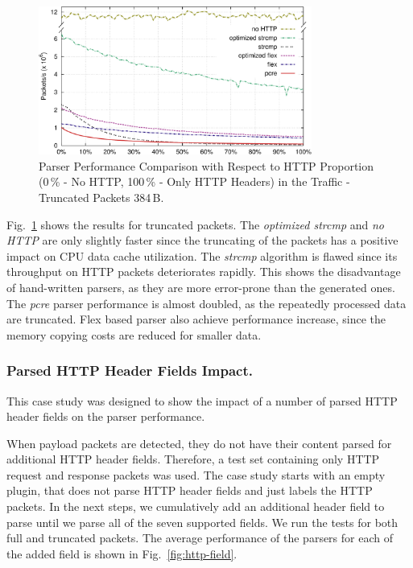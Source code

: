\begin{figure}[tb]
        \centering
        \includegraphics[width=0.8\textwidth]{figures/paper-http/384_pcap_norm_1}
        \caption{Parser Performance Comparison with Respect to HTTP Proportion (0\,\% - No HTTP, 100\,\% - Only HTTP Headers) in the Traffic - Truncated Packets 384\,B.}
        \label{fig:http-pcap_384}
\end{figure}

Fig.~\ref{fig:http-pcap_384} shows the results for truncated packets. The \emph{optimized strcmp} and \emph{no HTTP} are only slightly faster since the truncating of the packets has a positive impact on CPU data cache utilization. The \emph{strcmp} algorithm is flawed since its throughput on HTTP packets deteriorates rapidly. This shows the disadvantage of hand-written parsers, as they are more error-prone than the generated ones. The \emph{pcre} parser performance is almost doubled, as the repeatedly processed data are truncated. Flex based parser also achieve performance increase, since the memory copying costs are reduced for smaller data.

\subsubsection*{Parsed HTTP Header Fields Impact.}

This case study was designed to show the impact of a number of parsed HTTP header fields on the parser performance. 

When payload packets are detected, they do not have their content parsed for additional HTTP header fields. Therefore, a test set containing only HTTP request and response packets was used. The case study starts with an empty plugin, that does not parse HTTP header fields and just labels the HTTP packets. In the next steps, we cumulatively add an additional header field to parse until we parse all of the seven supported fields. We run the tests for both full and truncated packets. The average performance of the parsers for each of the added field is shown in Fig.~\ref{fig:http-field}.

